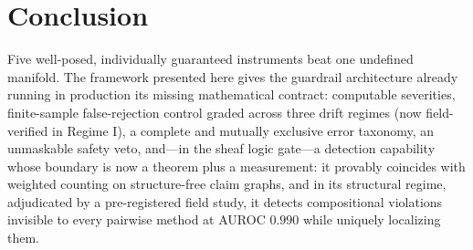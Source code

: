 \section{Conclusion}

Five well-posed, individually guaranteed instruments beat one undefined
manifold. The framework presented here gives the guardrail architecture
already running in production its missing mathematical contract: computable
severities, finite-sample false-rejection control graded across three drift
regimes (now field-verified in Regime I), a complete and mutually exclusive
error taxonomy, an unmaskable safety veto, and---in the sheaf logic gate---a
detection capability whose boundary is now a theorem plus a measurement: it
provably coincides with weighted counting on structure-free claim graphs, and
in its structural regime, adjudicated by a pre-registered field study, it
detects compositional violations invisible to every pairwise method at AUROC
$0.990$ while uniquely localizing them.
